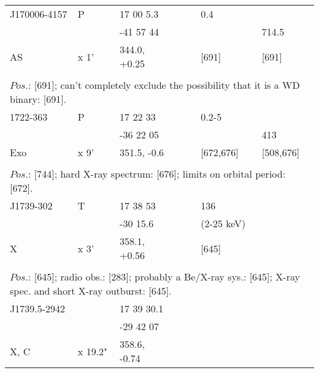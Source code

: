 \documentclass{aa}
\begin{document}
\begin{table*}[h]
\begin{tabular}{p{2.5cm}p{1cm}p{1.8cm}p{2.3cm}p{3.3cm}p{2.0cm}p{2.2cm}}
\noalign{\smallskip}
\hline
\noalign{\smallskip}
J170006-4157 &  P     &   17 00 5.3        &       &           &   0.4            &             \\                         
                           &          &  -41 57 44        &       &           &                     &  714.5  \\
AS                     & x 1'   &   344.0, +0.25  &       &           &        [691]    &    [691] \\
  
\\
\multicolumn{7}{p{17.5cm}}{
$Pos$.: [691]; can't completely exclude the possibility that it is a WD binary: [691].    }\\

\noalign{\smallskip}
\hline
\noalign{\smallskip}
 1722-363     &  P       & 17 22 33       &                    &                      &    0.2-5            &                        \\
                      &           & -36 22 05       &                    &                     &                           & 413         \\
Exo           & x 9'  & 351.5, -0.6       &                     &                      & [672,676]        &  [508,676]  \\
\\
\multicolumn{7}{p{17.5cm}}{
$Pos$.: [744]; hard X-ray spectrum: [676]; limits on orbital period: [672]. }\\

\noalign{\smallskip}
\hline
\noalign{\smallskip}
J1739-302 &  T      &     17 38 53       &             &           &   136              &       \\                  
                    &           &    -30 15.6         &              &           &  (2-25 keV)  &       \\                  
X                  &  x 3'  & 358.1, +0.56    &               &           &  [645]            &       \\
\\
\multicolumn{7}{p{17.5cm}}{
$Pos$.: [645]; radio obs.: [283]; probably a Be/X-ray sys.: [645]; X-ray spec. and short X-ray outburst: [645].   }\\

\noalign{\smallskip}
\hline
\noalign{\smallskip}
J1739.5-2942 &                &  17 39 30.1   &          &   &   &  \\                                                    
                          &                & -29 42 07      &          &   &   &  \\                                                 
X, C                  & x 19.2"   & 358.6, -0.74 &          &   &   &    \\                                     
  

\end{tabular}
\end{table*}
\end{document}

